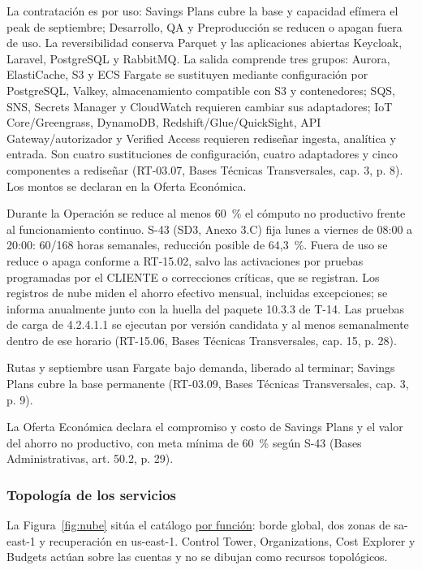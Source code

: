 La contratación es por uso: Savings Plans cubre la base y capacidad efímera el peak de septiembre; Desarrollo, QA y Preproducción se reducen o apagan fuera de uso. La reversibilidad conserva Parquet y las aplicaciones abiertas Keycloak, Laravel, PostgreSQL y RabbitMQ. La salida comprende tres grupos: Aurora, ElastiCache, S3 y ECS Fargate se sustituyen mediante configuración por PostgreSQL, Valkey, almacenamiento compatible con S3 y contenedores; SQS, SNS, Secrets Manager y CloudWatch requieren cambiar sus adaptadores; IoT Core/Greengrass, DynamoDB, Redshift/Glue/QuickSight, API Gateway/autorizador y Verified Access requieren rediseñar ingesta, analítica y entrada. Son cuatro sustituciones de configuración, cuatro adaptadores y cinco componentes a rediseñar (RT-03.07, Bases Técnicas Transversales, cap. 3, p. 8). Los montos se declaran en la Oferta Económica.

Durante la Operación se reduce al menos 60~\% el cómputo no productivo frente al funcionamiento continuo. S-43 (SD3, Anexo 3.C) fija lunes a viernes de 08:00 a 20:00: 60/168 horas semanales, reducción posible de 64,3~\%. Fuera de uso se reduce o apaga conforme a RT-15.02, salvo las activaciones por pruebas programadas por el CLIENTE o correcciones críticas, que se registran. Los registros de nube miden el ahorro efectivo mensual, incluidas excepciones; se informa anualmente junto con la huella del paquete 10.3.3 de T-14. Las pruebas de carga de 4.2.4.1.1 se ejecutan por versión candidata y al menos semanalmente dentro de ese horario (RT-15.06, Bases Técnicas Transversales, cap. 15, p. 28).

Rutas y septiembre usan Fargate bajo demanda, liberado al terminar; Savings Plans cubre la base permanente (RT-03.09, Bases Técnicas Transversales, cap. 3, p. 9).

La Oferta Económica declara el compromiso y costo de Savings Plans y el valor del ahorro no productivo, con meta mínima de 60~\% según S-43 (Bases Administrativas, art. 50.2, p. 29).

\subsubsection{Topología de los servicios}

La Figura~\ref{fig:nube} sitúa el catálogo \hyperref[tab:servicios-nube]{por función}: borde global, dos zonas de sa-east-1 y recuperación en us-east-1. Control Tower, Organizations, Cost Explorer y Budgets actúan sobre las cuentas y no se dibujan como recursos topológicos.

